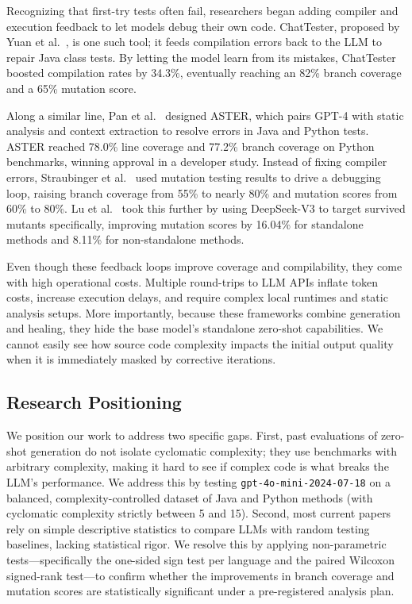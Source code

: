 \documentclass[conference]{IEEEtran}
\begin{document}
Recognizing that first-try tests often fail, researchers began adding compiler and execution feedback to let models debug their own code. ChatTester, proposed by Yuan et al.~\cite{yuan2024chattester}, is one such tool; it feeds compilation errors back to the LLM to repair Java class tests. By letting the model learn from its mistakes, ChatTester boosted compilation rates by 34.3\%, eventually reaching an 82\% branch coverage and a 65\% mutation score.

Along a similar line, Pan et al.~\cite{pan2024aster} designed ASTER, which pairs GPT-4 with static analysis and context extraction to resolve errors in Java and Python tests. ASTER reached 78.0\% line coverage and 77.2\% branch coverage on Python benchmarks, winning approval in a developer study. Instead of fixing compiler errors, Straubinger et al.~\cite{straubinger2025mutation} used mutation testing results to drive a debugging loop, raising branch coverage from 55\% to nearly 80\% and mutation scores from 60\% to 80\%. Lu et al.~\cite{lu2026beyond} took this further by using DeepSeek-V3 to target survived mutants specifically, improving mutation scores by 16.04\% for standalone methods and 8.11\% for non-standalone methods.

Even though these feedback loops improve coverage and compilability, they come with high operational costs. Multiple round-trips to LLM APIs inflate token costs, increase execution delays, and require complex local runtimes and static analysis setups. More importantly, because these frameworks combine generation and healing, they hide the base model's standalone zero-shot capabilities. We cannot easily see how source code complexity impacts the initial output quality when it is immediately masked by corrective iterations.

\subsection{Research Positioning}
\label{subsec:positioning}

We position our work to address two specific gaps. First, past evaluations of zero-shot generation do not isolate cyclomatic complexity; they use benchmarks with arbitrary complexity, making it hard to see if complex code is what breaks the LLM's performance. We address this by testing \texttt{gpt-4o-mini-2024-07-18} on a balanced, complexity-controlled dataset of Java and Python methods (with cyclomatic complexity strictly between 5 and 15). Second, most current papers rely on simple descriptive statistics to compare LLMs with random testing baselines, lacking statistical rigor. We resolve this by applying non-parametric tests---specifically the one-sided sign test per language and the paired Wilcoxon signed-rank test---to confirm whether the improvements in branch coverage and mutation scores are statistically significant under a pre-registered analysis plan.
\end{document}
